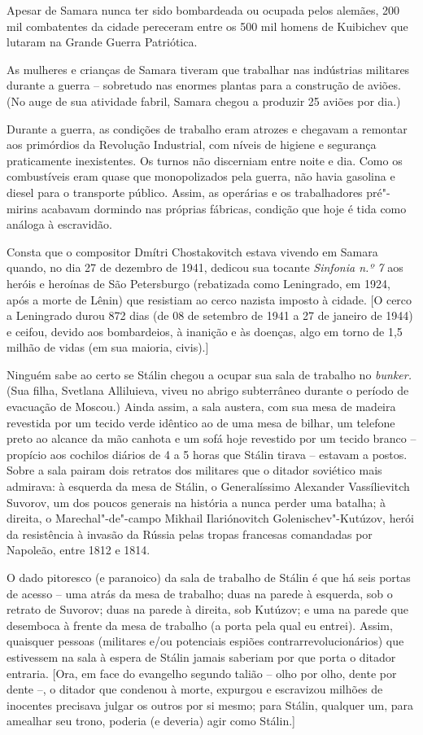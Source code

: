 Apesar de Samara nunca ter sido bombardeada ou ocupada pelos alemães,
200 mil combatentes da cidade pereceram entre os 500 mil homens de
Kuibichev que lutaram na Grande Guerra Patriótica.

As mulheres e crianças de Samara tiveram que trabalhar nas indústrias
militares durante a guerra -- sobretudo nas enormes plantas para a
construção de aviões. (No auge de sua atividade fabril, Samara chegou a
produzir 25 aviões por dia.)

Durante a guerra, as condições de trabalho eram atrozes e chegavam a
remontar aos primórdios da Revolução Industrial, com níveis de higiene e
segurança praticamente inexistentes. Os turnos não discerniam entre
noite e dia. Como os combustíveis eram quase que monopolizados pela
guerra, não havia gasolina e diesel para o transporte público. Assim, as
operárias e os trabalhadores pré"-mirins acabavam dormindo nas próprias
fábricas, condição que hoje é tida como análoga à escravidão.

Consta que o compositor Dmítri Chostakovitch estava vivendo em Samara
quando, no dia 27 de dezembro de 1941, dedicou sua tocante
\emph{Sinfonia n.º 7} aos heróis e heroínas de São Petersburgo
(rebatizada como Leningrado, em 1924, após a morte de Lênin) que
resistiam ao cerco nazista imposto à cidade. {[}O cerco a Leningrado
durou 872 dias (de 08 de setembro de 1941 a 27 de janeiro de 1944) e
ceifou, devido aos bombardeios, à inanição e às doenças, algo em torno
de 1,5 milhão de vidas (em sua maioria, civis).{]}

Ninguém sabe ao certo se Stálin chegou a ocupar sua sala de trabalho no
\emph{bunker.} (Sua filha, Svetlana Alliluieva, viveu no abrigo
subterrâneo durante o período de evacuação de Moscou.) Ainda assim, a
sala austera, com sua mesa de madeira revestida por um tecido verde
idêntico ao de uma mesa de bilhar, um telefone preto ao alcance da mão
canhota e um sofá hoje revestido por um tecido branco -- propício aos
cochilos diários de 4 a 5 horas que Stálin tirava -- estavam a postos.
Sobre a sala pairam dois retratos dos militares que o ditador soviético
mais admirava: à esquerda da mesa de Stálin, o Generalíssimo Alexander
Vassílievitch Suvorov, um dos poucos generais na história a nunca perder
uma batalha; à direita, o Marechal"-de"-campo Mikhail Ilariónovitch
Golenischev"-Kutúzov, herói da resistência à invasão da Rússia pelas
tropas francesas comandadas por Napoleão, entre 1812 e 1814.

O dado pitoresco (e paranoico) da sala de trabalho de Stálin é que há
seis portas de acesso -- uma atrás da mesa de trabalho; duas na parede à
esquerda, sob o retrato de Suvorov; duas na parede à direita, sob
Kutúzov; e uma na parede que desemboca à frente da mesa de trabalho (a
porta pela qual eu entrei). Assim, quaisquer pessoas (militares e/ou
potenciais espiões contrarrevolucionários) que estivessem na sala à
espera de Stálin jamais saberiam por que porta o ditador entraria.
{[}Ora, em face do evangelho segundo talião -- olho por olho, dente por
dente --, o ditador que condenou à morte, expurgou e escravizou milhões
de inocentes precisava julgar os outros por si mesmo; para Stálin,
qualquer um, para amealhar seu trono, poderia (e deveria) agir como
Stálin.{]}

